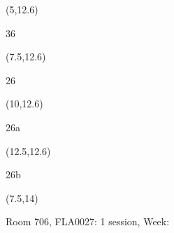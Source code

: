 \documentclass[a4paper]{article}
\newcommand{\myseat}[4]{%
\vspace{-0.1cm}
\parbox[t][2.2cm][t]{3.5cm}{
\small #1 %
\begin{description}
\vspace{-0.1cm}
\item [ID:] #2
\vspace{-0.1cm}
\item [Team:] #3 \normalsize
\vspace{-0.1cm}
\item \normalsize #4
\vspace{-0.1cm}
\end{description}
}
}
\begin{document}
\begin{CJK}{UTF8}{cyberbit}
\begin{textblock}{2.5}(5,12.6)
\textblockcolor{}
\myseat{36}{}{}{}
\end{textblock}

\begin{textblock}{2.5}(7.5,12.6)
\textblockcolor{}
\myseat{26}{}{}{}
\end{textblock}

\begin{textblock}{2.5}(10,12.6)
\textblockcolor{}
\myseat{26a}{}{}{}
\end{textblock}

\begin{textblock}{2.5}(12.5,12.6)
\textblockcolor{}
\myseat{26b}{}{}{}
\end{textblock}

\begin{textblock}{7.5}(7.5,14)
\textblockcolor{}
\parbox[t][2.2cm][t]{9.5cm}{%
\large Room 706, FLA0027: 1 session, Week: 
}
\end{textblock}

\end{CJK}
\end{document}
